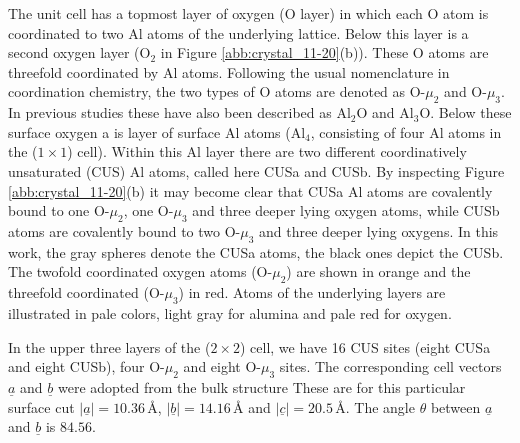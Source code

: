 \documentclass[11pt,DIV=13,BCOR=5mm,a4paper,headinclude]{scrbook}
\renewcommand{\vec}[1]{\underline{#1}}
\begin{document}
The unit cell has a topmost layer of oxygen (O layer) in which each O atom is coordinated to two Al atoms of the underlying lattice.
Below this layer is a second oxygen layer (O$_2$ in Figure \ref{abb:crystal_11-20}(b)).
These O atoms are threefold coordinated by Al atoms.
Following the usual nomenclature in coordination chemistry, the two types of O atoms are denoted as O-$\mu_2$ and O-$\mu_3$.
In previous studies these have also been described as Al$_2$O and Al$_3$O\cite{sung}.
Below these surface oxygen a is layer of surface Al atoms (Al$_4$, consisting of four Al atoms in the ($1\times 1$) cell).
Within this Al layer there are two different coordinatively unsaturated (CUS) Al atoms, called here CUSa and CUSb.
By inspecting Figure \ref{abb:crystal_11-20}(b) it may become clear that CUSa Al atoms are covalently bound to one O-$\mu_2$, one O-$\mu_3$ and three deeper lying oxygen atoms, while CUSb atoms are covalently bound to two O-$\mu_3$ and three deeper lying oxygens.
In this work, the gray spheres denote the CUSa atoms, the black ones depict the CUSb.
The twofold coordinated oxygen atoms (O-$\mu_2$) are shown in orange and the threefold coordinated (O-$\mu_3$) in red.
Atoms of the underlying layers are illustrated in pale colors, light gray for alumina and pale red for oxygen.

In the upper three layers of the ($2\times 2$) cell, we have 16 CUS sites (eight CUSa and eight CUSb), four O-$\mu_2$ and eight O-$\mu_3$ sites.
The corresponding cell vectors $\vec{a}$ and $\vec{b}$ were adopted from the bulk structure
These are for this particular surface cut $|\vec{a}|=10.36\,$\AA, $|\vec{b}|=14.16\,$\AA{} and $|\vec{c}|=20.5\,$\AA.
The angle $\theta$ between $\vec{a}$ and $\vec{b}$ is $84.56$\textdegree{}.
\end{document}
